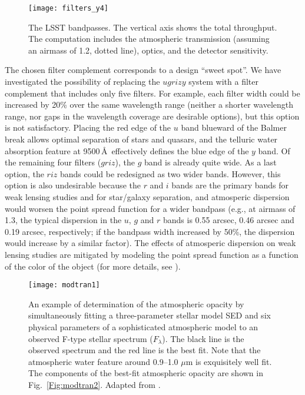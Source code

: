 \begin{figure}
\texttt{[image: filters\_y4]}
\caption{The LSST bandpasses. The vertical axis shows the total throughput. The computation
includes the atmospheric transmission (assuming an airmass of 1.2, %
dotted line), optics, and the detector sensitivity.}
\label{Fig:filters}
\end{figure}

The chosen filter complement corresponds to a design ``sweet spot''. We have
investigated the possibility of replacing the $ugrizy$ system with a
filter complement that includes only five filters. For example, each filter
width could be increased by 20\% over the same wavelength range (neither a
shorter wavelength range, nor gaps in the wavelength coverage are desirable
options), but this option is not satisfactory. Placing the red edge of the $u$
band blueward of the Balmer break allows optimal separation of stars and
quasars, and the telluric water absorption feature at 9500\,\AA\
effectively defines the blue edge of the $y$ band. Of the remaining four
filters ($griz$), the $g$ band is already quite wide. As a last option, the
$riz$ bands could be redesigned as two wider bands. However, this option is also
undesirable because the $r$ and $i$ bands are the primary bands for weak
lensing studies and for star/galaxy separation, and atmosperic dispersion 
would worsen the point spread function for a wider bandpass (e.g., at airmass of 
1.3, the typical dispersion in the $u$, $g$ and $r$ bands is 0.55 arcsec,
0.46 arcsec and 0.19 arcsec, respectively; if the bandpass width increased
by 50\%, the dispersion would increase by a similar factor). The effects of 
atmosperic dispersion on weak lensing studies are mitigated by modeling 
the point spread function as a function of the color of the object (for more
details, see \citealt{2015ApJ...807..182M, 2018MNRAS.479.1491C}). 

 

\begin{figure}
\texttt{[image: modtran1]}
\caption{An example of determination of the atmospheric opacity by
simultaneously fitting a three-parameter stellar model SED \citep{1979ApJS...40....1K} and
six physical parameters of a sophisticated atmospheric model \citep[MODTRAN,][]{1999SPIE.3866....2A}
to an observed F-type stellar spectrum ($F_\lambda$). The black
line is the observed spectrum and the red line is the best fit. Note that the
atmospheric water feature around 0.9--1.0 $\mu$m is exquisitely well fit.
The components of the best-fit atmospheric opacity are shown in
Fig.~\ref{Fig:modtran2}. Adapted from \citet{2010ApJ...720..811B}.}
\label{Fig:modtran1}
\end{figure}

